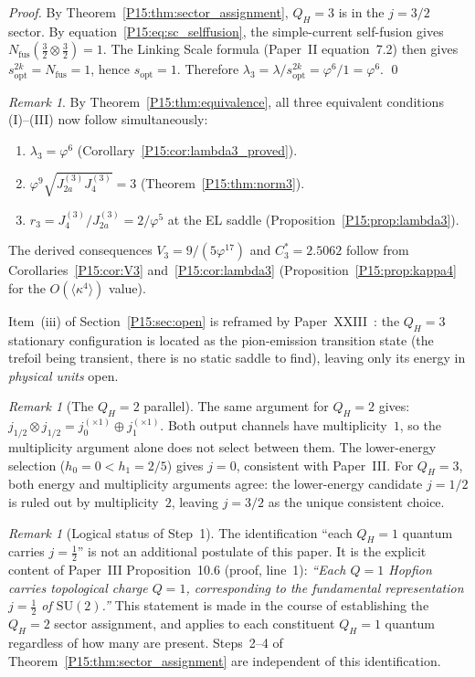 \documentclass[11pt,a4paper]{article}
\theoremstyle{definition}\newtheorem{definition}[theorem]{Definition}
\theoremstyle{remark}
\newtheorem{remark}[theorem]{Remark}
\newcommand{\vp}{\varphi}
\newcommand{\lam}{\lambda}
\newcommand{\Ja}{J_{2a}}
\newcommand{\Jfour}{J_4}
\newcommand{\QH}{Q_H}
\begin{document}
\begin{proof}
By Theorem~\ref{P15:thm:sector_assignment}, $\QH=3$ is in the
$j=3/2$ sector.
By equation~\eqref{P15:eq:sc_selffusion}, the simple-current
self-fusion gives $N_{\mathrm{fus}}(\tfrac32\otimes\tfrac32)=1$.
The Linking Scale formula (Paper~II equation~7.2) then gives
$s_{\mathrm{opt}}^{2k}=N_{\mathrm{fus}}=1$, hence $s_{\mathrm{opt}}=1$.
Therefore $\lam_3 = \lam/s_{\mathrm{opt}}^{2k} = \vp^6/1 = \vp^6$.
\qed
\end{proof}

\begin{remark}
\label{P15:rem:three_conditions_summary}
By Theorem~\ref{P15:thm:equivalence}, all three equivalent
conditions (I)--(III) now follow simultaneously:
\begin{enumerate}[noitemsep,label=\textup{(\Roman*)}]
\item $\lam_3=\vp^6$ (Corollary~\ref{P15:cor:lambda3_proved}).
\item $\vp^9\sqrt{\Ja^{(3)}\Jfour^{(3)}}=3$ (Theorem~\ref{P15:thm:norm3}).
\item $r_3=J_4^{(3)}/J_{2a}^{(3)}=2/\vp^5$ at the EL saddle
  (Proposition~\ref{P15:prop:lambda3}).
\end{enumerate}
The derived consequences $V_3=9/(5\vp^{17})$ and $C_3^*=2.5062$
follow from Corollaries~\ref{P15:cor:V3} and~\ref{P15:cor:lambda3}
(Proposition~\ref{P15:prop:kappa4} for the $O(\langle\kappa^4\rangle)$ value).

Item~(iii) of Section~\ref{P15:sec:open} is reframed by
Paper~XXIII~\cite{Paper23}: the $\QH=3$ stationary configuration is
located as the pion-emission transition state (the trefoil being
transient, there is no static saddle to find), leaving only its energy
in \emph{physical units} open.
\end{remark}

\begin{remark}[The $\QH=2$ parallel]
\label{P15:rem:qh2_parallel}
The same argument for $\QH=2$ gives:
$j_{1/2}\otimes j_{1/2} = j_0^{(\times 1)}\oplus j_1^{(\times 1)}$.
Both output channels have multiplicity~$1$, so the multiplicity
argument alone does not select between them.
The lower-energy selection ($h_0=0 < h_1=2/5$) gives $j=0$,
consistent with Paper~III.
For $\QH=3$, both energy and multiplicity arguments agree: the
lower-energy candidate $j=1/2$ is ruled out by multiplicity~$2$,
leaving $j=3/2$ as the unique consistent choice.
\end{remark}

\begin{remark}[Logical status of Step~1]
\label{P15:rem:step1_status}
The identification ``each $\QH=1$ quantum carries $j=\frac12$''
is not an additional postulate of this paper.
It is the explicit content of Paper~III
Proposition~10.6 (proof, line~1):
\emph{``Each $Q=1$ Hopfion carries topological charge $Q=1$,
corresponding to the fundamental representation $j=\frac12$
of $\mathrm{SU}(2)$.''}
This statement is made in the course of establishing the
$\QH=2$ sector assignment, and applies to each constituent
$\QH=1$ quantum regardless of how many are present.
Steps~2--4 of Theorem~\ref{P15:thm:sector_assignment} are
independent of this identification.
\end{remark}
\end{document}
